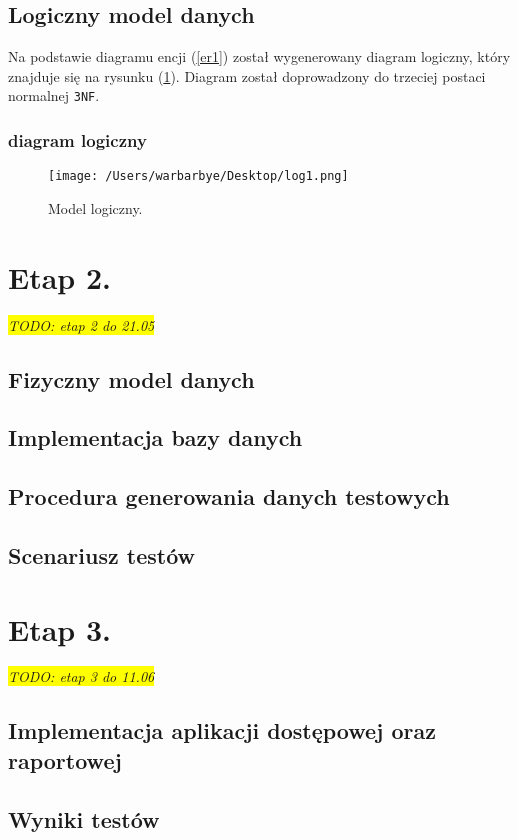 \documentclass{article}
\newcommand{\todo}[1]{
	\colorbox{yellow} {{\color{red}
	\emph {TODO: #1}
}}}
\begin{document}
\subsection{Logiczny model danych}
Na podstawie diagramu encji (\ref{er1}) został wygenerowany diagram logiczny, który znajduje się na rysunku (\ref{log1}). Diagram został doprowadzony do trzeciej postaci normalnej \texttt{3NF}.
\subsubsection{diagram logiczny}
\begin{figure}[H]
			\centering

			\texttt{[image: /Users/warbarbye/Desktop/log1.png]}
					\label{log1}
			\caption{Model logiczny.}
\end{figure}

\section{Etap 2. \label{s2}}
\todo{etap 2 do 21.05}
\subsection{Fizyczny model danych}
\subsection{Implementacja bazy danych}
\subsection{Procedura generowania danych testowych}
\subsection{Scenariusz testów}
\section{Etap 3. \label{s3}}
\todo{etap 3 do 11.06}
\subsection{Implementacja aplikacji dostępowej oraz raportowej}
\subsection{Wyniki testów}
\end{document}
